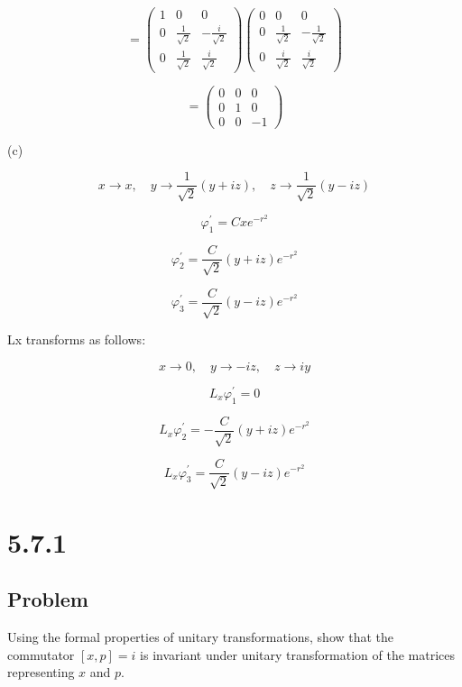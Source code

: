 \documentclass[12pt]{article}
\begin{document}
\[
    = \begin{pmatrix}
        1 & 0                  & 0                   \\
        0 & \frac{1}{\sqrt{2}} & -\frac{i}{\sqrt{2}} \\
        0 & \frac{1}{\sqrt{2}} & \frac{i}{\sqrt{2}}
    \end{pmatrix}
    \begin{pmatrix}
        0 & 0                  & 0                   \\
        0 & \frac{1}{\sqrt{2}} & -\frac{1}{\sqrt{2}} \\
        0 & \frac{i}{\sqrt{2}} & \frac{i}{\sqrt{2}}
    \end{pmatrix}
\]

\[
    = \begin{pmatrix}
        0 & 0 & 0  \\
        0 & 1 & 0  \\
        0 & 0 & -1
    \end{pmatrix}
\]

(c)

\[
    x \rightarrow x, \quad y \rightarrow \frac{1}{\sqrt{2}}(y + i z), \quad z \rightarrow \frac{1}{\sqrt{2}}(y - i z)
\]

\[
    \varphi^{'}_1 = C x e^{-r^2}
\]

\[
    \varphi^{'}_2 = \frac{C}{\sqrt{2}}(y + i z) e^{-r^2}
\]

\[
    \varphi^{'}_3 = \frac{C}{\sqrt{2}}(y - i z) e^{-r^2}
\]

Lx transforms as follows:

\[
    x \rightarrow 0, \quad y \rightarrow -iz, \quad z \rightarrow iy
\]

\[
    L_x \varphi_1^{\prime} = 0
\]

\[
    L_x \varphi_2^{\prime} = -\frac{C}{\sqrt{2}}(y + iz) e^{-r^2}
\]

\[
    L_x \varphi_3^{\prime} = \frac{C}{\sqrt{2}}(y - iz) e^{-r^2}
\]

\newpage
\section{5.7.1}

\subsection{Problem}

Using the formal properties of unitary transformations, show that the commutator \([x, p]=i\) is invariant under unitary transformation of the matrices representing \(x\) and \(p\).
\end{document}
